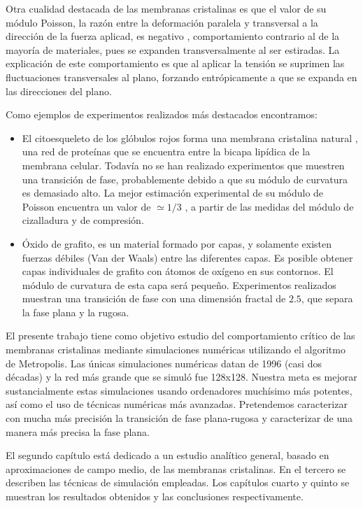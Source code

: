 Otra cualidad destacada de las membranas cristalinas es que el valor de su módulo Poisson,
la razón entre la deformación paralela y transversal a la dirección de 
la fuerza aplicad, es negativo \cite{Bowick_poisson_ratio}, comportamiento
contrario al de la mayoría de materiales, pues se expanden transversalmente al
ser estiradas. La explicación de este comportamiento es que al aplicar la
tensión se suprimen las fluctuaciones transversales al plano, forzando
entrópicamente a que se expanda en las direcciones del plano. 

Como ejemplos de experimentos realizados más destacados encontramos:
\begin{itemize}
\item El citoesqueleto de los glóbulos rojos forma una membrana cristalina
  natural \cite{Boal_MCell}, una red de proteínas que se encuentra entre la
  bicapa  lipídica de la membrana celular. Todavía no se han
  realizado experimentos que muestren una transición de fase, probablemente
  debido a que su módulo de curvatura es demasiado alto. La mejor estimación experimental de su
  módulo de Poisson encuentra un valor de $\simeq 1/3$ \cite{Discher:Molecular}, a partir de las
  medidas del módulo de cizalladura y de compresión.
\item Óxido de grafito, es un material formado por capas, y solamente existen
  fuerzas débiles (Van der Waals) entre las diferentes capas. Es posible
  obtener capas individuales de grafito con átomos de oxígeno en sus
  contornos. El módulo de curvatura de esta capa será pequeño. Experimentos
  realizados \cite{Hwa:Conformation} muestran una transición de fase con una dimensión fractal de
  $2.5$, que separa la fase plana y la rugosa.
\end{itemize}

El presente trabajo tiene como objetivo estudio del comportamiento crítico de
las membranas cristalinas mediante simulaciones numéricas utilizando el
algoritmo de Metropolis. Las únicas simulaciones numéricas datan de 1996 (casi
dos décadas) \cite{Bowick_flat_phase} y la red más grande que se simuló fue
128x128. Nuestra meta es mejorar sustancialmente estas simulaciones usando
ordenadores muchísimo más potentes, así como el uso de técnicas 
numéricas más avanzadas. Pretendemos caracterizar con mucha más precisión la
transición de fase plana-rugosa y caracterizar de una manera más precisa la
fase plana. 

El segundo capítulo está dedicado a un estudio analítico general, basado en
aproximaciones de campo medio, de las membranas
cristalinas. En el tercero se describen las técnicas de simulación
empleadas. Los capítulos cuarto y quinto se muestran los resultados obtenidos
y las conclusiones respectivamente.




  
